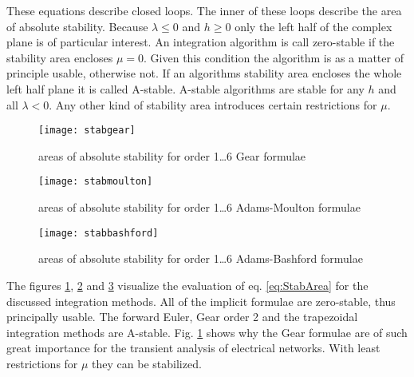 These equations describe closed loops. The inner of these loops
describe the area of absolute stability.  Because $\lambda \le 0$ and
$h \ge 0$ only the left half of the complex plane is of particular
interest.  An integration algorithm is call zero-stable if the
stability area encloses $\mu = 0$.  Given this condition the algorithm
is as a matter of principle usable, otherwise not.  If an algorithms
stability area encloses the whole left half plane it is called
A-stable.  A-stable algorithms are stable for any $h$ and all $\lambda
< 0$.  Any other kind of stability area introduces certain
restrictions for $\mu$.

\begin{figure}[ht]
\begin{center}
\texttt{[image: stabgear]}
\end{center}
\caption{areas of absolute stability for order 1\ldots 6 Gear formulae}
\label{fig:StabGear}
\end{figure}
\FloatBarrier

\begin{figure}[ht]
\begin{center}
\texttt{[image: stabmoulton]}
\end{center}
\caption{areas of absolute stability for order 1\ldots 6 Adams-Moulton formulae}
\label{fig:StabMoulton}
\end{figure}
\FloatBarrier

\begin{figure}[ht]
\begin{center}
\texttt{[image: stabbashford]}
\end{center}
\caption{areas of absolute stability for order 1\ldots 6 Adams-Bashford formulae}
\label{fig:StabBashford}
\end{figure}
\FloatBarrier

The figures \ref{fig:StabGear}, \ref{fig:StabMoulton} and
\ref{fig:StabBashford} visualize the evaluation of
eq. \eqref{eq:StabArea} for the discussed integration methods.  All of
the implicit formulae are zero-stable, thus principally usable.  The
forward Euler, Gear order 2 and the trapezoidal integration methods
are A-stable.  Fig. \ref{fig:StabGear} shows why the Gear formulae are
of such great importance for the transient analysis of electrical
networks.  With least restrictions for $\mu$ they can be stabilized.

